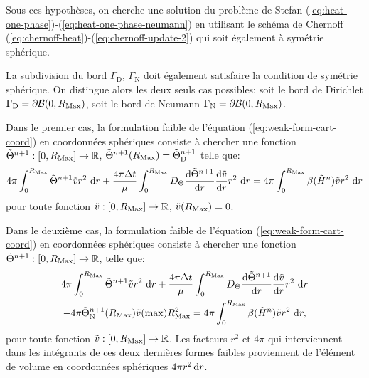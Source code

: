 Sous ces hypothèses, on cherche une solution du problème de Stefan
(\ref{eq:heat-one-phase})-(\ref{eq:heat-one-phase-neumann}) en
utilisant le schéma de Chernoff
(\ref{eq:chernoff-heat})-(\ref{eq:chernoff-update-2}) qui soit également
à symétrie sphérique.

La subdivision du bord $\Gamma_\mathrm{D}$, $\Gamma_\mathrm{N}$ doit
également satisfaire la condition de symétrie sphérique. On distingue alors les
deux seuls cas possibles:
soit le bord de Dirichlet $\Gamma_\mathrm{D} = \partial\mathcal
B(0,R_\mathrm{Max})$, soit le bord de Neumann $\Gamma_\mathrm{N} =
\partial\mathcal B(0,R_\mathrm{Max})$.

Dans le premier cas, la formulation faible de l'équation
(\ref{eq:weak-form-cart-coord}) en coordonnées sphériques consiste à
chercher une fonction $\tilde {\Theta}^{n+1}:[0,R_\mathrm{Max}] \to \mathbb
R$, $\tilde{\Theta}^{n+1}(R_\mathrm{Max}) =
\tilde{\Theta}_{\mathrm{D}}^{n+1}$ telle que:
\begin{multline}\label{eq:weak-form-spher-coord-dirichlet}
  4\pi\int_0^{\rmax} \tilde \temperature^{n+1}\tilde v r^2\,\intd{r}
  + \frac{4\pi\timestep}{\mu}\int_0^{\rmax} \electrolytetdiff\frac{\mathrm d %
    \tilde \temperature^{n+1}}{\mathrm d r} \frac{\mathrm d \tilde v}{\mathrm d %
    r}r^2\,\intd{r}  %
  = 4\pi\int_0^{\rmax} \beta(\tilde \enthalpydensity^n)\tilde v r^2\,\intd{r}
\end{multline}
pour toute fonction $\tilde v:[0,R_\mathrm{Max}]\to\mathbb R$, $\tilde v(R_\mathrm{Max})
= 0$.

Dans le deuxième cas, la formulation faible de l'équation
(\ref{eq:weak-form-cart-coord}) en coordonnées sphériques consiste à
chercher une fonction $\tilde {\Theta}^{n+1}:[0,R_\mathrm{Max}] \to \mathbb
R$, telle que:
\begin{multline}\label{eq:weak-form-spher-coord-neumann}
  4\pi\int_0^{\rmax} \tilde \temperature^{n+1}\tilde v r^2\,\intd{r}
  + \frac{4\pi\timestep}{\mu}\int_0^{\rmax} \electrolytetdiff\frac{\mathrm d %
    \tilde \temperature^{n+1}}{\mathrm d r} \frac{\mathrm d \tilde v}{\mathrm d %
    r}r^2\,\intd{r} \\
  - 4\pi\tilde\temperature^{n+1}_\mathrm{N}(\rmax)\tilde v(\max)\rmax^2%
  = 4\pi\int_0^{\rmax} \beta(\tilde \enthalpydensity^n)\tilde v r^2\,\intd{r},
\end{multline}
pour toute fonction $\tilde v:[0,R_\mathrm{Max}]\to\mathbb R$. Les facteurs
$r^2$ et $4\pi$ qui interviennent dans les intégrants de ces deux dernières
formes faibles proviennent de l'élément de volume en
coordonnées sphériques $4\pi r^2\,\mathrm dr$.

